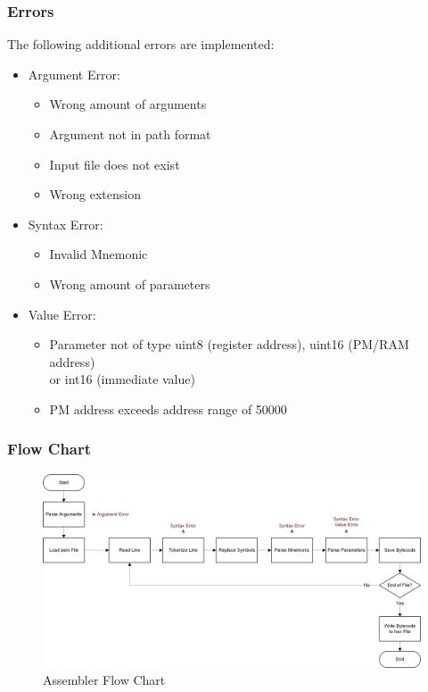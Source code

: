\subsubsection{Errors}
The following additional errors are implemented:
\begin{itemize}
    \item Argument Error: 
    \begin{itemize}
        \item Wrong amount of arguments
        \item Argument not in path format 
        \item Input file does not exist 
        \item Wrong extension
    \end{itemize}
    \item Syntax Error:
    \begin{itemize}
        \item Invalid Mnemonic
        \item Wrong amount of parameters
    \end{itemize}
    \item Value Error:
    \begin{itemize}
        \item Parameter not of type uint8 (register address), uint16 (PM/RAM address)\\
            or int16 (immediate value)
        \item PM address exceeds address range of 50000
    \end{itemize}
\end{itemize}
\newpage


\subsubsection{Flow Chart}
\begin{figure}[h]
    \begin{center}
        \includegraphics[scale=0.7]{assets/Assembler.png}
    \end{center}
    \caption{Assembler Flow Chart}
\end{figure}

